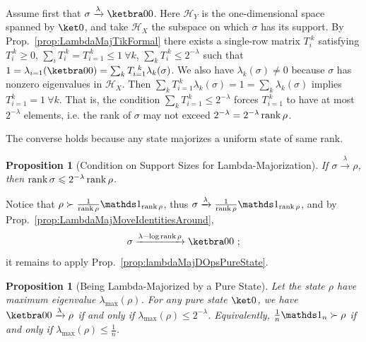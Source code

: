 \documentclass[10pt,letterpaper]{article}
\theoremstyle{plain}
\newtheorem{prop}[thm]{Proposition}
\def\Hs{\mathscr{H}}%
\newenvironment{myproof}[1][\proofname]{%
  \color{prooftextcolor} \footnotesize \proof[\itshape #1]\hspace*{1.2mm}%
}{\endproof}
\newcommand{\lambdamaj}[1]{\xrightarrow{#1}}
\begin{document}
\begin{myproof}[Proof of Prop.~\ref{prop:lambdaMajDOpsPureState}]
  Assume first that  $\sigma\lambdamaj\lambda\ketbra00$. Here $\Hs_Y$ is the one-dimensional space
  spanned by $\ket0$, and take $\Hs_X$ the subspace on which $\sigma$ has its support. By
  Prop.~\ref{prop:LambdaMajTikFormal} there exists a single-row matrix
  $T_i^{~k}$ satisfying $T_i^{~k}\geqslant 0$, $\sum_i T_i^{~k} = T_{i=1}^{~k} \leqslant 1~\forall k$,
  $\sum_k T_i^{~k} \leqslant 2^{-\lambda}$ such that
  $1 = \lambda_{i=1}(\ketbra00) = \sum_k T_{i=1}^{~k} \lambda_k(\sigma)$. We also have $\lambda_k(\sigma)\neq 0$
  because $\sigma$ has nonzero eigenvalues in $\Hs_X$. Then
  $\sum_k T_{i=1}^{~k} \lambda_k(\sigma) = 1 = \sum_k\lambda_k(\sigma)$ implies $T_{i=1}^k = 1~\forall k$.
  That is, the condition $\sum_k T_{i=1}^{~k} \leqslant 2^{-\lambda}$ forces $T_{i=1}^{~k}$ to have at most
  $2^{-\lambda}$ elements, i.e. the rank of $\sigma$ may not exceed $2^{-\lambda}=2^{-\lambda} \operatorname{rank}\rho$.

  The converse holds because any state majorizes a uniform state of same rank.
\end{myproof}

\begin{prop}[Condition on Support Sizes for Lambda-Majorization]
  \label{prop:lambdaMajDOpsConditionRanks}
  If $\sigma\lambdamaj\lambda\rho$, then $\operatorname{rank}\sigma\leqslant 2^{-\lambda}\operatorname{rank}\rho$. 
\end{prop}

\begin{myproof}[Proof of Prop.~\ref{prop:lambdaMajDOpsConditionRanks}]
  Notice that $\rho\succ\frac1{\rank\rho}\Ident_{\rank\rho}$, thus
  $\sigma\lambdamaj\lambda\frac1{\rank\rho}\Ident_{\rank\rho}$, and by
  Prop.~\ref{prop:LambdaMajMoveIdentitiesAround},
  \begin{equation*}
    \sigma\lambdamaj{\lambda-\log\rank\rho} \ketbra00\ ;
  \end{equation*}
  it remains to apply Prop.~\ref{prop:lambdaMajDOpsPureState}.
\end{myproof}


\begin{prop}[Being Lambda-Majorized by a Pure State]
  \label{prop:LambdaMajorizedDOpsByPureState}
  Let the state $\rho$ have maximum eigenvalue $\lambda_\mathrm{max}(\rho)$.
  For any pure state $\ket0$, we have $\ketbra00 \lambdamaj\lambda \rho$ if and only if
  $\lambda_\mathrm{max}(\rho) \leqslant 2^{-\lambda}$. Equivalently, $\frac1n\Ident_n\succ\rho$ if and
  only if $\lambda_\mathrm{max}(\rho) \leqslant \frac1n$.
\end{prop}
\end{document}

